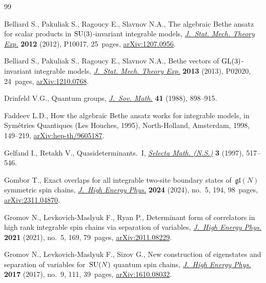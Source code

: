 \documentclass[pdftex]{sigma}
\theoremstyle{definition}
\begin{document}
\begin{thebibliography}{99}
\footnotesize\itemsep=0pt

Belliard S., Pakuliak S., Ragoucy E., Slavnov N.A., The algebraic {B}ethe
 ansatz for scalar products in {${\rm SU}(3)$}-invariant integrable models,
 \href{https://doi.org/10.1088/1742-5468/2012/10/p10017}{\textit{J.~Stat.
 Mech. Theory Exp.}} \textbf{2012} (2012), P10017, 25~pages,
 \href{http://arxiv.org/abs/1207.0956}{arXiv:1207.0956}.

Belliard S., Pakuliak S., Ragoucy E., Slavnov N.A., Bethe vectors of {${\rm
 GL}(3)$}-invariant integrable models,
 \href{https://doi.org/10.1088/1742-5468/2013/02/p02020}{\textit{J.~Stat.
 Mech. Theory Exp.}} \textbf{2013} (2013), P02020, 24~pages,
 \href{http://arxiv.org/abs/1210.0768}{arXiv:1210.0768}.

Drinfeld V.G., Quantum groups,
 \href{https://doi.org/10.1007/BF01247086}{\textit{J.~Sov. Math.}} \textbf{41}
 (1988), 898--915.

Faddeev L.D., How the algebraic {B}ethe ansatz works for integrable models, in
 Sym\'{e}tries {Q}uantiques ({L}es {H}ouches, 1995), North-Holland, Amsterdam,
 1998, 149--219,
 \href{http://arxiv.org/abs/hep-th/9605187}{arXiv:hep-th/9605187}.

Gelfand I., Retakh V., Quasideterminants.~{I},
 \href{https://doi.org/10.1007/s000290050019}{\textit{Selecta Math. (N.S.)}}
 \textbf{3} (1997), 517--546.

Gombor T., Exact overlaps for all integrable two-site boundary states
 of~{$\mathfrak{gl}(N)$} symmetric spin chains,
 \href{https://doi.org/10.1007/jhep05(2024)194}{\textit{J.~High Energy Phys.}}
 \textbf{2024} (2024), no.~5, 194, 98~pages,
 \href{http://arxiv.org/abs/2311.04870}{arXiv:2311.04870}.

Gromov N., Levkovich-Maslyuk F., Ryan P., Determinant form of correlators in
 high rank integrable spin chains via separation of variables,
 \href{https://doi.org/10.1007/jhep05(2021)169}{\textit{J.~High Energy Phys.}}
 \textbf{2021} (2021), no.~5, 169, 79~pages,
 \href{http://arxiv.org/abs/2011.08229}{arXiv:2011.08229}.

Gromov N., Levkovich-Maslyuk F., Sizov G., New construction of eigenstates and
 separation of variables for~{${\rm SU}(N)$} quantum spin chains,
 \href{https://doi.org/10.1007/jhep09(2017)111}{\textit{J.~High Energy Phys.}}
 \textbf{2017} (2017), no.~9, 111, 39~pages,
 \href{http://arxiv.org/abs/1610.08032}{arXiv:1610.08032}.


\end{thebibliography}
\end{document}
